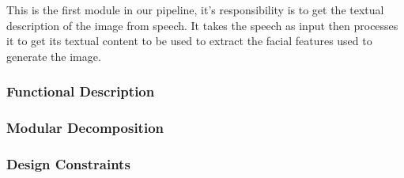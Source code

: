 This is the first module in our pipeline, it’s responsibility is to get the textual description of the image from speech.
It takes the speech as input then processes it to get its textual content to be used to extract the facial features used to generate the image.

\subsubsection{Functional Description}

\subsubsection{Modular Decomposition}

\subsubsection{Design Constraints}

